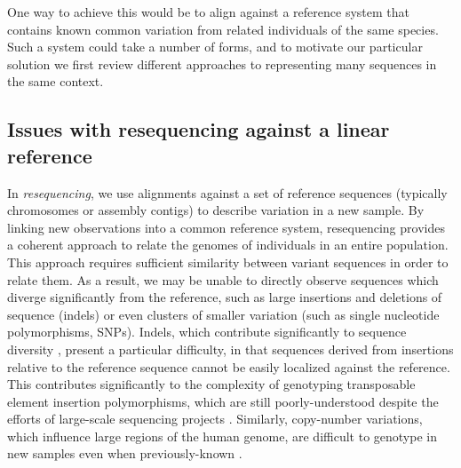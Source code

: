 \documentclass{article}
\begin{document}
One way to achieve this would be to align against a reference system that contains known common variation from related individuals of the same species.
Such a system could take a number of forms, and to motivate our particular solution we first review different approaches to representing many sequences in the same context.

\subsection{Issues with resequencing against a linear reference}

In \emph{resequencing}, we use alignments against a set of reference sequences (typically chromosomes or assembly contigs) to describe variation in a new sample.
By linking new observations into a common reference system, resequencing provides a coherent approach to relate the genomes of individuals in an entire population.
This approach requires sufficient similarity between variant sequences in order to relate them.
As a result, we may be unable to directly observe sequences which diverge significantly from the reference, such as large insertions and deletions of sequence (indels) or even clusters of smaller variation (such as single nucleotide polymorphisms, SNPs).
Indels, which contribute significantly to sequence diversity \cite{mills2010}, present a particular difficulty, in that sequences derived from insertions relative to the reference sequence cannot be easily localized against the reference.
This contributes significantly to the complexity of genotyping transposable element insertion polymorphisms, which are still poorly-understood despite the efforts of large-scale sequencing projects \cite{stewart2011}.
Similarly, copy-number variations, which influence large regions of the human genome, are difficult to genotype in new samples even when previously-known \cite{sudmant2010}.
\end{document}
